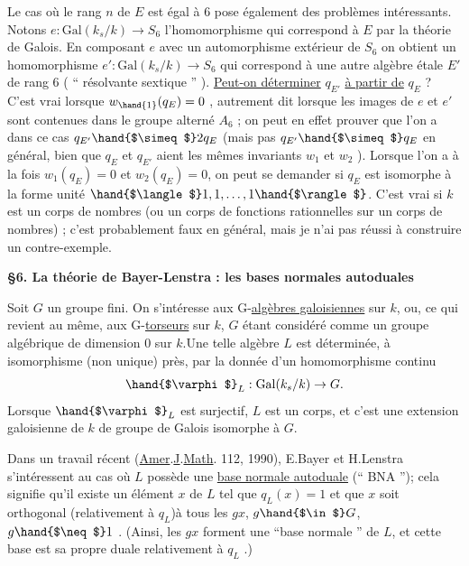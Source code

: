 
Le cas où le rang $n$ de $E$ est égal à $6$ pose également des problèmes
intéressants. Notons $e : \mathrm{Gal}(k_s/k) \to S_6$ l'homomorphisme qui correspond à
$E$ par la théorie de Galois. En composant $e$ avec un automorphisme extérieur
de $S_6$ on obtient un homomorphisme $e' : \mathrm{Gal}(k_s/k) \to S_6$ qui correspond
à une autre algèbre étale $E'$ de rang $6$ ( `` résolvante sextique '' ).
\uline{Peut-on déterminer} $q_{E'}$ \uline{à partir de} $q_E$ ? C'est vrai lorsque $w_{\hand{1}}(q_E) = 0$ ,
autrement dit lorsque les images de $e$ et $e'$ sont contenues dans le
groupe alterné $A_6$ ; on peut en effet prouver que l'on a dans ce cas
$q_{E'} \hand{$\simeq$} 2q_E$ (mais pas $q_{E'} \hand{$\simeq$} q_E$ en général, bien que $q_E$ et $q_{E'}$ aient les
mêmes invariants $w_1$ et $w_2$ ). Lorsque l'on a à la fois $w_1(q_E) = 0$
et $w_2(q_E) = 0$, on peut se demander si $q_E$ est isomorphe à la forme
unité $\hand{$\langle$}1,1,\ldots,1\hand{$\rangle$}$. C'est vrai si $k$ est un corps de nombres (ou un corps
de fonctions rationnelles sur un corps de nombres) ; c'est probablement
faux en général, mais je n'ai pas réussi à construire un contre-exemple.

\textbf{§6. La théorie de Bayer-Lenstra : les bases normales autoduales}

Soit $G$ un groupe fini. On s'intéresse aux G-\uline{algèbres galoisiennes}
sur $k$, ou, ce qui revient au même, aux G-\uline{torseurs} sur $k$, $G$ étant considéré
comme un groupe algébrique de dimension $0$ sur $k$.Une telle algèbre $L$ est
déterminée, à isomorphisme (non unique) près, par la donnée d'un homomorphisme
continu
\[ \hand{$\varphi$}_L : \mathrm{Gal}(k_s/k) \to G. \]
Lorsque $\hand{$\varphi$}_L$ est surjectif, $L$ est un corps, et c'est une extension
galoisienne de $k$ de groupe de Galois isomorphe à $G$.

Dans un travail récent (\uline{Amer}.\uline{J}.\uline{Math}. 112, 1990), E.Bayer et H.Lenstra
s'intéressent au cas où $L$ possède une \uline{base normale autoduale} (`` BNA '');
cela signifie qu'il existe un élément $x$ de $L$ tel que $q_L(x) = 1$ et
que $x$ soit orthogonal (relativement à $q_L$)à tous les $gx$, $g \hand{$\in$} G$, $g \hand{$\neq$} 1$ .
(Ainsi, les $gx$ forment une ``base normale '' de $L$, et cette base est sa
propre duale relativement à $q_L$ .)

